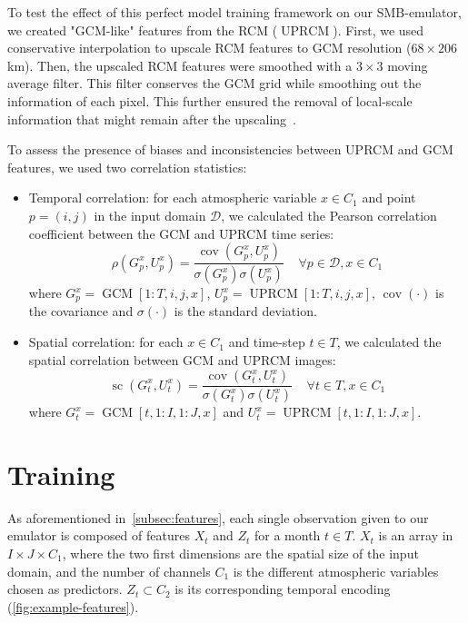 \documentclass[a4paper,11pt,oneside]{report}
\begin{document}
To test the effect of this perfect model training framework on our SMB-emulator, we created "GCM-like" features from the RCM ($\operatorname{UPRCM}$). First, we used conservative interpolation to upscale RCM features to GCM resolution ($68\times206$ km). Then, the upscaled RCM features were smoothed with a $3\times3$ moving average filter. This filter conserves the GCM grid while smoothing out the information of each pixel. This further ensured the removal of local-scale information that might remain after the upscaling~\cite{Doury, Klaver2020}.


To assess the presence of biases and inconsistencies between UPRCM and GCM features, we used two correlation statistics:  
\begin{itemize}
        \item Temporal correlation: for each atmospheric variable $x\in C_1$ and point $p = (i,j)$ in the input domain $\mathcal{D}$, we calculated the Pearson correlation coefficient between the GCM and UPRCM time series:
        \begin{equation}\label{eq:temporal-corr}
            \rho\left(G_{p}^x,U_{p}^x\right) = \frac{\operatorname{cov}(G_{p}^x,U_{p}^x)}{\sigma(G_{p}^x)\sigma(U_{p}^x)} \;\;\;\; \forall p \in \mathcal{D}, x\in C_1 
        \end{equation}
        where $G_{p}^x = \operatorname{GCM}[1:T, i, j, x]$, $U_{p}^x = \operatorname{UPRCM}[1:T, i, j, x]$, $\operatorname {cov}(\cdot)$  is the covariance and  $\sigma(\cdot)$ is the standard deviation.  
        \item Spatial correlation: for each $x\in C_1$ and time-step $t \in T$, we calculated the spatial correlation between GCM and UPRCM images: 
        \begin{equation}\label{eq:spatial-corr}
            \operatorname{sc}\left(G_{t}^x,U_{t}^x\right) = \frac{\operatorname{cov}(G_{t}^x,U_{t}^x)}{\sigma(G_{t}^x)\sigma(U_{t}^x)} \;\;\;\; \forall t \in T, x\in C_1 
        \end{equation}
        where $G_{t}^x = \operatorname{GCM}[t,1:I,1:J,x]$ and $U_{t}^x =\operatorname{UPRCM}[t,1:I,1:J,x]$. 
    \end{itemize}


\section{Training}\label{subsec:training}
As aforementioned in~\autoref{subsec:features}, each single observation given to our emulator is composed of features $X_t$ and $Z_t$ for a month $t\in T$. $X_t$ is an array in $I \times J \times C_1$, where the two first dimensions are the spatial size of the input domain, and the number of channels $C_1$ is the different atmospheric variables chosen as predictors. $Z_t \subset C_2$ is its corresponding temporal encoding (\autoref{fig:example-features}).
\end{document}
